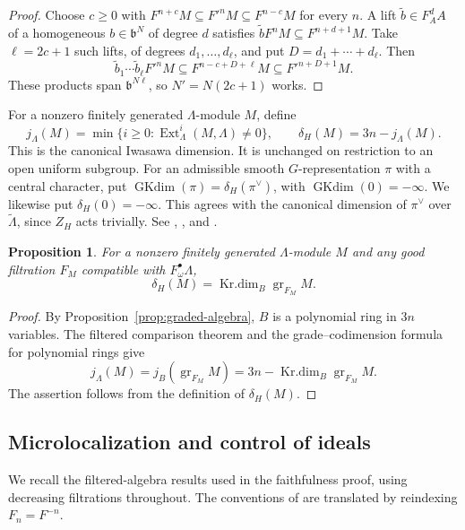 \documentclass[11pt]{article}
\numberwithin{equation}{section}
\newtheorem{proposition}[theorem]{Proposition}
\theoremstyle{definition}
\theoremstyle{remark}
\DeclareMathOperator{\gr}{gr}
\DeclareMathOperator{\Ext}{Ext}
\DeclareMathOperator{\GKdim}{GKdim}
\DeclareMathOperator{\Krdim}{Kr.dim}
\begin{document}
\begin{proof}
Choose $c\geq0$ with
$F^{n+c}M\subseteq F'^nM\subseteq F^{n-c}M$ for every $n$.
A lift $\widetilde b\in F_A^dA$ of a homogeneous
$b\in\mathfrak b^N$ of degree $d$ satisfies
$\widetilde b F^nM\subseteq F^{n+d+1}M$.
Take $\ell=2c+1$ such lifts, of degrees $d_1,\ldots,d_\ell$, and
put $D=d_1+\cdots+d_\ell$. Then
\[
 \widetilde b_1\cdots\widetilde b_\ell F'^nM
 \subseteq F^{n-c+D+\ell}M\subseteq F'^{n+D+1}M.
\]
These products span $\mathfrak b^{N\ell}$, so $N'=N(2c+1)$ works.
\end{proof}

For a nonzero finitely generated $\Lambda$-module $M$, define
\[
 j_\Lambda(M)=\min\{i\geq0:\Ext^i_\Lambda(M,\Lambda)\ne0\},
 \qquad \delta_H(M)=3n-j_\Lambda(M).
\]
This is the canonical Iwasawa dimension. It is unchanged on restriction
to an open uniform subgroup. For an admissible smooth $G$-representation
$\pi$ with a central character, put
$\GKdim(\pi)=\delta_H(\pi^\vee)$, with $\GKdim(0)=-\infty$.
We likewise put $\delta_H(0)=-\infty$.
This agrees with the canonical dimension of $\pi^\vee$ over
$\widetilde\Lambda$, since $Z_H$ acts trivially. See \cite[\S\S~5.4--5.5]{AB06},
\cite[Thm.~3.1 and Prop.~3.2]{Koh17}, and \cite[\S~6.1]{Sor26b}.

\begin{proposition}\label{prop:canonical-dimension}
For a nonzero finitely generated $\Lambda$-module $M$ and any good
filtration $F_M$ compatible with $F_\omega^\bullet\Lambda$,
\[
 \delta_H(M)=\Krdim_B\gr_{F_M}M.
\]
\end{proposition}

\begin{proof}
By Proposition~\ref{prop:graded-algebra}, $B$ is a polynomial ring
in $3n$ variables. The filtered comparison theorem
\cite[III.2.5, Thm.~2]{LvO96} and the grade--codimension formula
for polynomial rings give
\[
 j_\Lambda(M)=j_B(\gr_{F_M}M)
 =3n-\Krdim_B\gr_{F_M}M.
\]
The assertion follows from the definition of $\delta_H(M)$.
\end{proof}

\subsection{Microlocalization and control of ideals}\label{subsec:control}

We recall the filtered-algebra results used in the faithfulness proof,
using decreasing filtrations throughout. The conventions of
\cite{AW09} are translated by reindexing $F_n=F^{-n}$.
\end{document}
